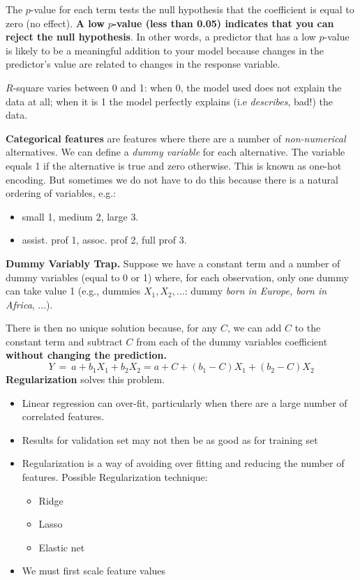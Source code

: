 The $p$-value for each term tests the null hypothesis that the coefficient is equal to zero (no effect). \textbf{A low }$p$\textbf{-value (less than 0.05) indicates that you can reject the null hypothesis}. In other words, a predictor that has a low $p$-value is likely to be a meaningful addition to your model because changes in the predictor's value are related to changes in the response variable.

$R$-square varies between 0 and 1: when 0, the model used does not explain the data at all; when it is 1 the model perfectly explains (i.e \textit{describes}, bad!) the data. 

\textbf{Categorical features} are features where there are a number of \textit{non-numerical} alternatives. We can define a \textit{dummy variable} for each alternative. The variable equals 1 if the alternative is true and zero otherwise. This is known as one-hot encoding. But sometimes we do not have to do this because there is a natural ordering of variables, e.g.:
\begin{itemize}
    \item small 1, medium 2, large 3.
    \item assist. prof 1, assoc. prof 2, full prof 3.
\end{itemize}

\textbf{Dummy Variably Trap.} Suppose we have a constant term and a number of dummy variables (equal to 0 or 1) where, for each observation, only one dummy can take value 1 (e.g., dummies $X_{1} ,X_{2} ,\dotsc $: dummy \textit{born in Europe, born in Africa}, ...).

There is then no unique solution because, for any $C$, we can add $C$ to the constant term and subtract $C$ from each of the dummy variables coefficient \textbf{without changing the prediction.}
\begin{equation*}
    Y\ =\ a+b_{1} X_{1} +b_{2} X_{2} =a+C+( b_{1} -C) X_{1} +( b_{2} -C) X_{2}
\end{equation*}
\textbf{Regularization} solves this problem.
\begin{itemize}
    \item Linear regression can over-fit, particularly when there are a large number of correlated features.
    \item Results for validation set may not then be as good as for training set
    \item Regularization is a way of avoiding over fitting and reducing the number of features. Possible Regularization technique:
          \begin{itemize}
              \item Ridge 
              \item Lasso
              \item Elastic net
          \end{itemize}
    \item We must first scale feature values
\end{itemize}
